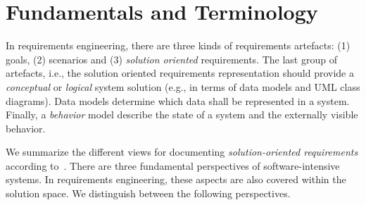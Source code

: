 \documentclass{llncs} %
\begin{document}
\section{Fundamentals and Terminology}

In requirements engineering, there are three kinds of requirements artefacts:
(1) goals, (2) scenarios and (3) \emph{solution oriented} requirements.
The last group of artefacts, i.e., the solution oriented requirements representation
should provide a \emph{conceptual} or \emph{logical} system solution
(e.g., in terms of data models and UML class diagrams).
Data models determine which data shall be represented in a system.
Finally, a \emph{behavior} model describe the state of a system and the externally visible behavior.

We summarize the different views for 
documenting \emph{solution-oriented requirements} according to~\cite{Pohl2010RE}.
There are three fundamental perspectives of software-intensive systems.
In requirements engineering, these aspects are also covered within the solution space.
We distinguish between the following perspectives.
\end{document}
